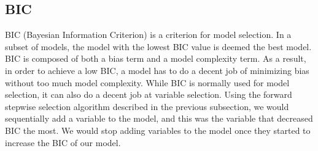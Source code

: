 \documentclass{article}
\begin{document}
\subsection{BIC}
BIC (Bayesian Information Criterion) is a criterion for model selection. In a subset of models, the model with the lowest BIC value is deemed the best model. BIC is composed of both a bias term and a model complexity term. As a result, in order to achieve a low BIC, a model has to do a decent job of minimizing bias without too much model complexity. While BIC is normally used for model selection, it can also do a decent job at variable selection. Using the forward stepwise selection algorithm 
described in the previous subsection, we would sequentially add a variable to the model, and this was the variable that decreased BIC the most. We would stop adding variables to the model once they started to increase the BIC of our model. 
\end{document}
